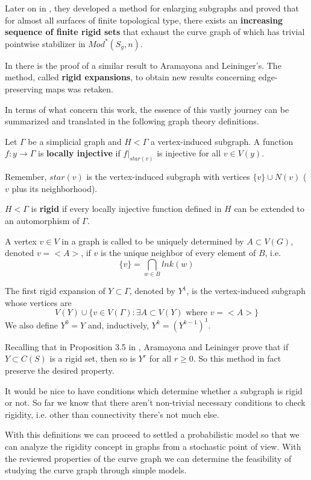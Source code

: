 Later on in \cite[Aramayona, Leininger - 13]{exhaustionByRigidSets}, they developed a method for enlarging subgraphs and proved that for almost all surfaces of finite topological type, there exists an \textbf{increasing sequence of finite rigid sets} that exhaust the curve graph of which has trivial pointwise stabilizer in $Mod^{\ast}(S_{g},n)$.

In \cite[J. Hernández]{exhaustionCurveGraph} there is the proof of a similar result to Aramayona and Leininger's. The method,  called \textbf{rigid expansions}, to obtain new results concerning edge-preserving maps was retaken. 

In terms of what concern this work, the essence of this vastly journey can be summarized and translated in the following graph theory definitions.

\begin{defini}
Let $\Gamma$ be a simplicial graph and $H<\Gamma$ a vertex-induced subgraph. A function $f:y\to \Gamma$ is \textbf{locally injective} if $f|_{star(v)}$ is injective for all $v \in V(y)$. 
\end{defini}

\begin{nota}
Remember, $star(v)$ is the vertex-induced subgraph with vertices $\{ v \} \cup N(v)$ ($v$ plus its neighborhood).
\end{nota}

\begin{defini}
$H<\Gamma$ is \textbf{rigid} if every locally injective function defined in $H$ can be extended to an automorphism of $\Gamma$. \end{defini}

A vertex $v \in V$ in a graph is called to be uniquely determined by $A\subset V(G)$, denoted $v=<A>$, if $v$ is the unique neighbor of every element of $B$, i.e.
$$ \{ v \} = \bigcap_{w\in B} lnk(w) $$
\begin{defini}
The first rigid expansion of $Y\subset \Gamma$, denoted by $Y^{1}$, is the vertex-induced subgraph whose vertices are
$$ V(Y) \cup \{ v\in V(\Gamma) :  \exists A \subset V(Y) \text{ where } v = <A>  \}$$
We also define $Y^{0} = Y$ and, inductively, $Y^{k} = (Y^{k-1})^{1}$.
\end{defini}

Recalling that in Proposition 3.5 in \cite{exhaustionByRigidSets}, Aramayona and Leininger prove that if $Y \subset C(S)$ is a rigid set, then so is $Y^{r} $ for all $r \geq 0$. So this method in fact preserve the desired property.

It would be nice to have conditions which determine whether a subgraph is rigid or not. So far we know that there aren't non-trivial necessary conditions to check rigidity, i.e. other than connectivity there's not much else.

With this definitions we can proceed to settled a probabilistic model so that we can analyze the rigidity concept in graphs from a stochastic point of view. With the reviewed properties of the curve graph we can determine the feasibility of studying the curve graph through simple models.